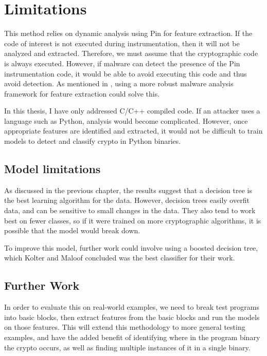 \chapter{Limitations}

This method relies on dynamic analysis using Pin for feature extraction.  If the code of interest is not executed during instrumentation, then it will not be analyzed and extracted.  Therefore, we must assume that the cryptographic code is always executed.  However, if malware can detect the presence of the Pin instrumentation code, it would be able to avoid executing this code and thus avoid detection. As mentioned in \cite{grobert}, using a more robust malware analysis framework for feature extraction could solve this.

In this thesis, I have only addressed C/C++ compiled code.  If an attacker uses a language such as Python, analysis would become complicated.  However, once appropriate features are identified and extracted, it would not be difficult to train models to detect and classify crypto in Python binaries.


\section{Model limitations}
As discussed in the previous chapter, the results suggest that a decision tree is the best learning algorithm for the data.  However, decision trees easily overfit data, and can be sensitive to small changes in the data.  They also tend to work best on fewer classes, so if it were trained on more cryptographic algorithms, it is possible that the model would break down. 

To improve this model, further work could involve using a boosted decision tree, which Kolter and Maloof concluded was the best classifier for their work\cite{kolter}.%



\section{Further Work}
In order to evaluate this on real-world examples, we need to break test programs into basic blocks, then extract features from the basic blocks and run the models on those features.  This will extend this methodology to more general testing examples, and have the added benefit of identifying where in the program binary the crypto occurs, as well as finding multiple instances of it in a single binary.

